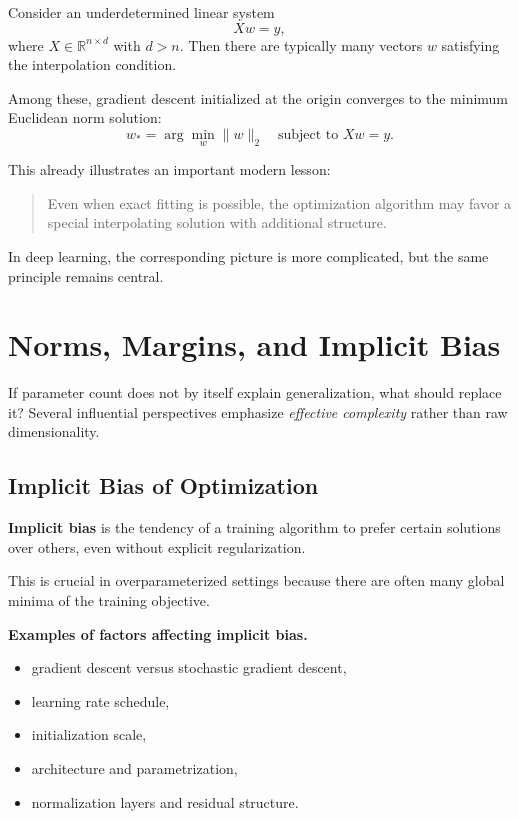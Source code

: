 Consider an underdetermined linear system
\[
Xw = y,
\]
where \(X \in \mathbb{R}^{n \times d}\) with \(d>n\). Then there are typically many vectors \(w\) satisfying the interpolation condition.

Among these, gradient descent initialized at the origin converges to the minimum Euclidean norm solution:
\[
w_* = \arg\min_{w} \|w\|_2
\quad \text{subject to } Xw=y.
\]

\medskip

\noindent
This already illustrates an important modern lesson:

\begin{quote}
Even when exact fitting is possible, the optimization algorithm may favor a special interpolating solution with additional structure.
\end{quote}

\medskip

\noindent
In deep learning, the corresponding picture is more complicated, but the same principle remains central.

\section{Norms, Margins, and Implicit Bias}

If parameter count does not by itself explain generalization, what should replace it? Several influential perspectives emphasize \emph{effective complexity} rather than raw dimensionality.

\subsection{Implicit Bias of Optimization}

\textbf{Implicit bias} is the tendency of a training algorithm to prefer certain solutions over others, even without explicit regularization.

\medskip

\noindent
This is crucial in overparameterized settings because there are often many global minima of the training objective.

\medskip

\noindent
\textbf{Examples of factors affecting implicit bias.}
\begin{itemize}
    \item gradient descent versus stochastic gradient descent,
    \item learning rate schedule,
    \item initialization scale,
    \item architecture and parametrization,
    \item normalization layers and residual structure.
\end{itemize}

